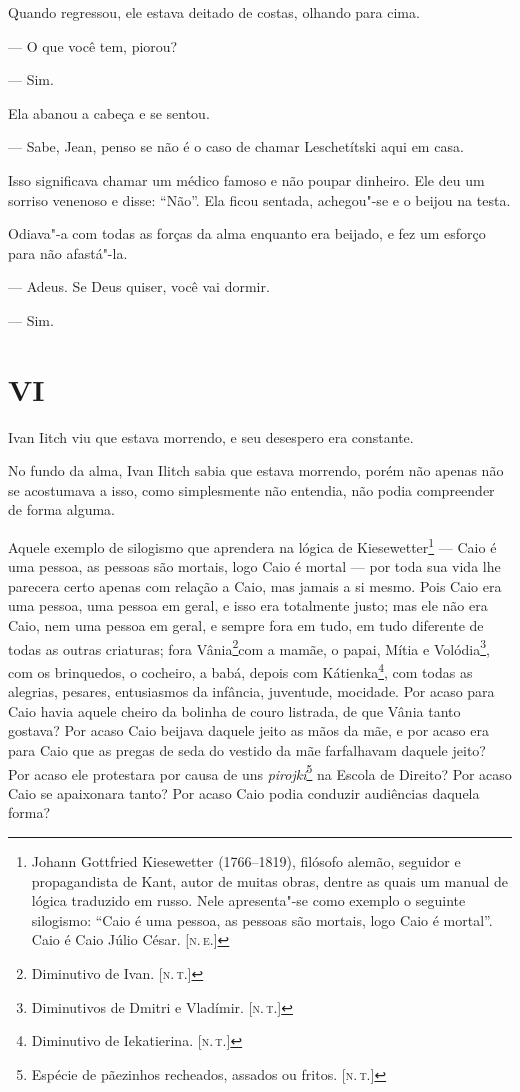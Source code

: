 Quando regressou, ele estava deitado de costas, olhando para cima.

--- O que você tem, piorou?

--- Sim.

Ela abanou a cabeça e se sentou.

--- Sabe, Jean, penso se não é o caso de chamar Leschetítski aqui em casa.

Isso significava chamar um médico famoso e não poupar dinheiro. Ele deu
um sorriso venenoso e disse: ``Não''. Ela ficou sentada, achegou"-se e o
beijou na testa.

Odiava"-a com todas as forças da alma enquanto era beijado, e fez um
esforço para não afastá"-la.

--- Adeus. Se Deus quiser, você vai dormir.

--- Sim.

\section*{VI}

Ivan Iitch viu que estava morrendo, e seu desespero era constante.

No fundo da alma, Ivan Ilitch sabia que estava morrendo, porém não
apenas não se acostumava a isso, como simplesmente não entendia, não
podia compreender de forma alguma.

Aquele exemplo de silogismo que aprendera na lógica de
Kiesewetter\footnote{Johann Gottfried Kiesewetter (1766--1819), filósofo
  alemão, seguidor e propagandista de Kant, autor de muitas obras,
  dentre as quais um manual de lógica traduzido em russo. Nele
  apresenta"-se como exemplo o seguinte silogismo: ``Caio é uma pessoa,
  as pessoas são mortais, logo Caio é mortal''. Caio é Caio Júlio César.
  {[}\textsc{n.\,e.}{]}} --- Caio é uma pessoa, as pessoas são mortais, logo Caio é
mortal --- por toda sua vida lhe parecera certo apenas com relação a
Caio, mas jamais a si mesmo. Pois Caio era uma pessoa, uma pessoa em
geral, e isso era totalmente justo; mas ele não era Caio, nem uma pessoa
em geral, e sempre fora em tudo, em tudo diferente de todas as outras
criaturas; fora Vânia\footnote{Diminutivo de Ivan. {[}\textsc{n.\,t.}{]}}com a
mamãe, o papai, Mítia e Volódia\footnote{Diminutivos de Dmitri e
  Vladímir. {[}\textsc{n.\,t.}{]}}, com os brinquedos, o cocheiro, a babá, depois
com Kátienka\footnote{Diminutivo de Iekatierina. {[}\textsc{n.\,t.}{]}}, com todas
as alegrias, pesares, entusiasmos da infância, juventude, mocidade. Por
acaso para Caio havia aquele cheiro da bolinha de couro listrada, de que
Vânia tanto gostava? Por acaso Caio beijava daquele jeito as mãos da
mãe, e por acaso era para Caio que as pregas de seda do vestido da mãe
farfalhavam daquele jeito? Por acaso ele protestara por causa de uns
\emph{pirojkí}\footnote{Espécie de pãezinhos recheados, assados ou
  fritos. {[}\textsc{n.\,t.}{]}} na Escola de Direito? Por acaso Caio se apaixonara
tanto? Por acaso Caio podia conduzir audiências daquela forma?

